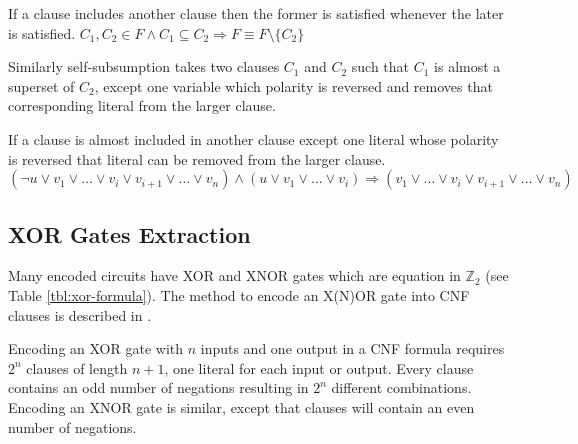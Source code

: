 \begin{myprop}[Subsumption]
  If a clause includes another clause then the former is satisfied whenever the
  later is satisfied.
  $C_1, C_2 \in F \land C_1 \subseteq C_2 \Rightarrow F \equiv F \setminus \{
  C_2 \}$
\end{myprop}

Similarly self-subsumption takes two clauses $C_1$ and $C_2$ such
that $C_1$ is almost a superset of $C_2$, except one variable which
polarity is reversed and removes that corresponding literal from
the larger clause.

\begin{myprop}
  If a clause is almost included in another clause except one literal whose
  polarity is reversed that literal can be removed from the larger clause.
  $(\neg u \lor v_1 \lor \ldots \lor v_i \lor v_{i+1} \lor \ldots \lor v_n)
    \land (u \lor v_1 \lor \ldots \lor v_i)
    \Rightarrow (v_1 \lor \ldots \lor v_i \lor v_{i+1} \lor \ldots \lor v_n)$
\end{myprop}


\subsection{XOR Gates Extraction}
\label{ssec:xor-extraction}

Many encoded circuits have XOR and XNOR gates which are equation
in $\mathbb{Z}_2$ (see Table \ref{tbl:xor-formula}). The method
to encode an X(N)OR gate into CNF clauses is described in
\cite{Roy_restoringcircuit}.

\begin{table}
  \centering

  \caption{XOR/XNOR gates}
  \label{tbl:xor-formula}
\end{table}

Encoding an XOR gate with $n$ inputs and one output in a CNF
formula requires $2^n$ clauses of length $n + 1$, one literal
for each input or output.  Every clause contains an odd number of
negations resulting in $2^n$ different combinations. Encoding an
XNOR gate is similar, except that clauses will contain an even
number of negations.

